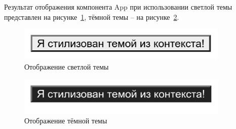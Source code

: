 Результат отображения компонента App при использовании светлой темы представлен на рисунке~\ref{img:react__context-light}, тёмной темы -- на рисунке~\ref{img:react__context-dark}.

\begin{figure}[H]
  \centering
  \includegraphics[width=0.9\textwidth]{assets/images/theoretical2/react_context-light.png}
  \caption{Отображение светлой темы}
  \label{img:react__context-light}
\end{figure}

\begin{figure}[H]
  \centering
  \includegraphics[width=0.9\textwidth]{assets/images/theoretical2/react_context-dark.png}
  \caption{Отображение тёмной темы}
  \label{img:react__context-dark}
\end{figure}